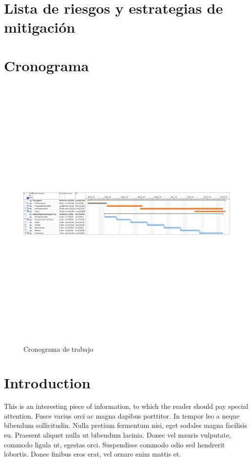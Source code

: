 \documentclass{article}
\begin{document}
\section{Lista de riesgos y estrategias de mitigación}

\section{Cronograma}

\begin{figure}[H]
		\centering
		\includegraphics[width=18cm, height=14cm, keepaspectratio]{./img/cronograma_proyecto.png}
		\caption{Cronograma de trabajo }
		\label{fig:cronograma}
	\end{figure}


\section*{Introduction} %

\begin{info} %
	This is an interesting piece of information, to which the reader should pay special attention. Fusce varius orci ac magna dapibus porttitor. In tempor leo a neque bibendum sollicitudin. Nulla pretium fermentum nisi, eget sodales magna facilisis eu. Praesent aliquet nulla ut bibendum lacinia. Donec vel mauris vulputate, commodo ligula ut, egestas orci. Suspendisse commodo odio sed hendrerit lobortis. Donec finibus eros erat, vel ornare enim mattis et.
\end{info}
\end{document}
